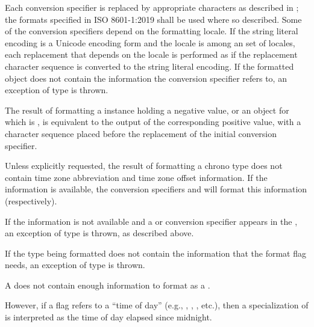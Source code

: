 \pnum
Each conversion specifier 
is replaced by appropriate characters
as described in ;
the formats specified in ISO 8601-1:2019 shall be used where so described.
Some of the conversion specifiers
depend on the formatting locale.
If the string literal encoding is a Unicode encoding form and
the locale is among
an  set of locales,
each replacement that depends on the locale is performed as if
the replacement character sequence is converted to the string literal encoding.
If the formatted object does not contain the information
the conversion specifier refers to,
an exception of type  is thrown.

\pnum
The result of formatting
a  instance holding a negative value, or
an  object  for which  is ,
is equivalent to the output of the corresponding positive value,
with a  character sequence
placed before the replacement of the initial conversion specifier.
\begin{example}
\end{example}

\pnum
Unless explicitly requested,
the result of formatting a chrono type
does not contain time zone abbreviation
and time zone offset information.
If the information is available,
the conversion specifiers  and 
will format this information (respectively).
\begin{note}
If the information is not available and
a  or 
conversion specifier appears in
the ,
an exception of type  is thrown,
as described above.
\end{note}

\pnum
If the type being formatted does not contain
the information that the format flag needs,
an exception of type  is thrown.
\begin{example}
A  does not contain enough information
to format as a .
\end{example}
However, if a flag refers to a ``time of day''
(e.g., , , , etc.),
then a specialization of  is interpreted as
the time of day elapsed since midnight.

